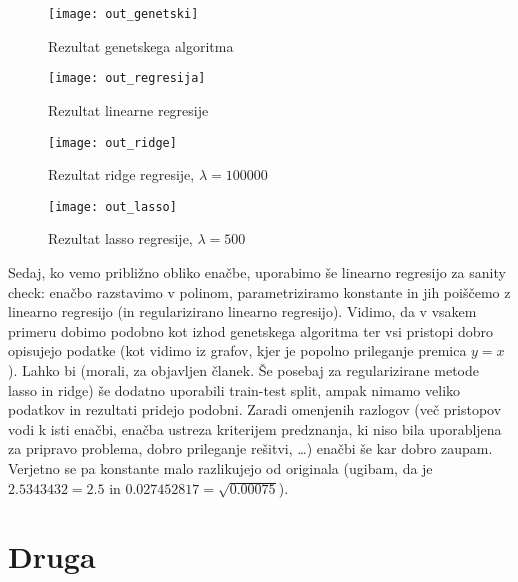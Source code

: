 \documentclass{article}
\begin{document}
\begin{figure}[htb]
    \texttt{[image: out\_genetski]}
    \caption{Rezultat genetskega algoritma}
\end{figure}
\begin{figure}[htb]
    \texttt{[image: out\_regresija]}
    \caption{Rezultat linearne regresije}
\end{figure}
\begin{figure}[htb]
    \texttt{[image: out\_ridge]}
    \caption{Rezultat ridge regresije, \(\lambda=100000\)}
\end{figure}
\begin{figure}[htb]
    \texttt{[image: out\_lasso]}
    \caption{Rezultat lasso regresije, \(\lambda=500\)}
\end{figure}
Sedaj, ko vemo približno obliko enačbe, uporabimo še linearno regresijo za sanity check: enačbo razstavimo v polinom, parametriziramo konstante in jih poiščemo z linearno regresijo (in regularizirano linearno regresijo). Vidimo, da v vsakem primeru dobimo podobno kot izhod genetskega algoritma ter vsi pristopi dobro opisujejo podatke (kot vidimo iz grafov, kjer je popolno prileganje premica \(y=x\)). Lahko bi (morali, za objavljen članek. Še posebaj za regularizirane metode lasso in ridge) še dodatno uporabili train-test split, ampak nimamo veliko podatkov in rezultati pridejo podobni. Zaradi omenjenih razlogov (več pristopov vodi k isti enačbi, enačba ustreza kriterijem predznanja, ki niso bila uporabljena za pripravo problema, dobro prileganje rešitvi, \dots) enačbi še kar dobro zaupam. Verjetno se pa konstante malo razlikujejo od originala (ugibam, da je \(2.5343432=2.5\) in \(0.027452817=\sqrt{0.00075}\)).


\section{Druga} 
\end{document}
